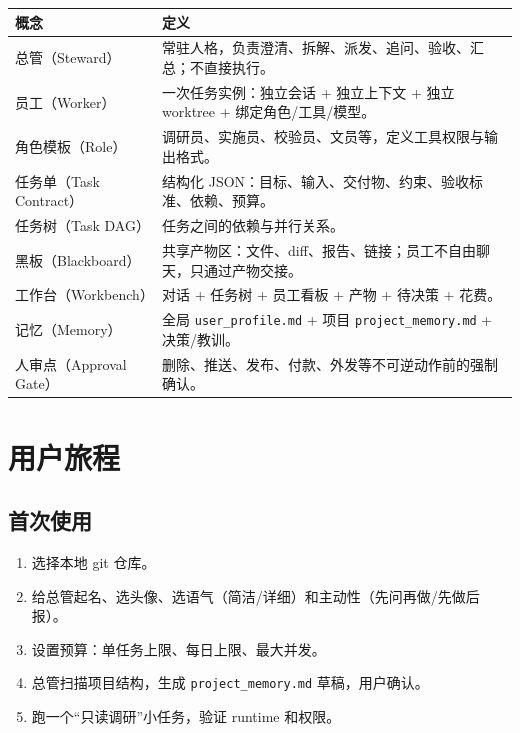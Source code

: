 \documentclass[UTF8,11pt,a4paper,fontset=windows]{ctexart}
\let\ocsection\section
\renewcommand{\section}{\Needspace{8\baselineskip}\ocsection}
\let\ocsubsection\subsection
\renewcommand{\subsection}{\Needspace{5\baselineskip}\ocsubsection}
\newcommand{\code}[1]{\texttt{#1}}
\begin{document}
\noindent\begin{minipage}{\linewidth}
\centering
{}
\small
\begin{tabularx}{\linewidth}{@{}p{3.0cm} X@{}}
\toprule
\textbf{概念} & \textbf{定义} \\
\midrule
总管（Steward） & 常驻人格，负责澄清、拆解、派发、追问、验收、汇总；不直接执行。 \\
员工（Worker） & 一次任务实例：独立会话 + 独立上下文 + 独立 worktree + 绑定角色/工具/模型。 \\
角色模板（Role） & 调研员、实施员、校验员、文员等，定义工具权限与输出格式。 \\
任务单（Task Contract） & 结构化 JSON：目标、输入、交付物、约束、验收标准、依赖、预算。 \\
任务树（Task DAG） & 任务之间的依赖与并行关系。 \\
黑板（Blackboard） & 共享产物区：文件、diff、报告、链接；员工不自由聊天，只通过产物交接。 \\
工作台（Workbench） & 对话 + 任务树 + 员工看板 + 产物 + 待决策 + 花费。 \\
记忆（Memory） & 全局 \code{user\_profile.md} + 项目 \code{project\_memory.md} + 决策/教训。 \\
人审点（Approval Gate） & 删除、推送、发布、付款、外发等不可逆动作前的强制确认。 \\
\bottomrule
\end{tabularx}
\end{minipage}

\section{用户旅程}

\subsection{首次使用}

\begin{enumerate}
  \item 选择本地 git 仓库。
  \item 给总管起名、选头像、选语气（简洁/详细）和主动性（先问再做/先做后报）。
  \item 设置预算：单任务上限、每日上限、最大并发。
  \item 总管扫描项目结构，生成 \code{project\_memory.md} 草稿，用户确认。
  \item 跑一个“只读调研”小任务，验证 runtime 和权限。
\end{enumerate}
\end{document}
